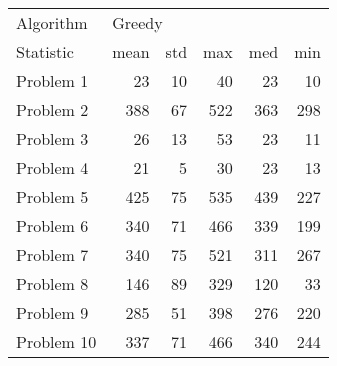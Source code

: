 \begin{tabular}{lrrrrr}
\toprule
Algorithm & \multicolumn{5}{l}{Greedy} \\
Statistic &   mean & std &  max &  med &  min \\
\midrule
Problem 1  &     23 &  10 &   40 &   23 &   10 \\
Problem 2  &    388 &  67 &  522 &  363 &  298 \\
Problem 3  &     26 &  13 &   53 &   23 &   11 \\
Problem 4  &     21 &   5 &   30 &   23 &   13 \\
Problem 5  &    425 &  75 &  535 &  439 &  227 \\
Problem 6  &    340 &  71 &  466 &  339 &  199 \\
Problem 7  &    340 &  75 &  521 &  311 &  267 \\
Problem 8  &    146 &  89 &  329 &  120 &   33 \\
Problem 9  &    285 &  51 &  398 &  276 &  220 \\
Problem 10 &    337 &  71 &  466 &  340 &  244 \\
\bottomrule
\end{tabular}
